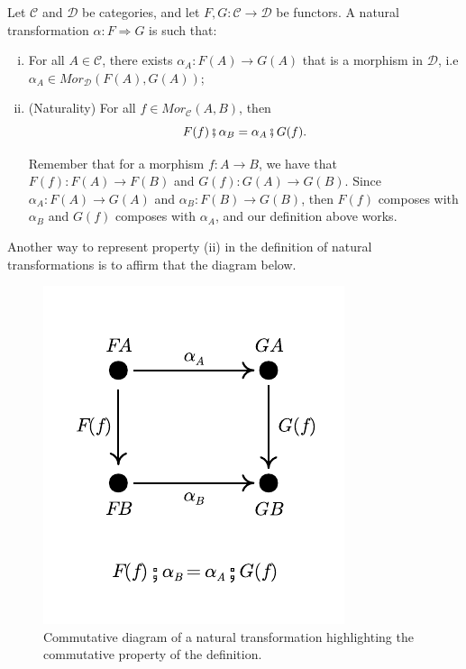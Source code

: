 \begin{definition}
	Let $\mathcal C$ and $\mathcal D$ be categories, and let $F,G:\mathcal C \to \mathcal D$ be functors.
	A natural transformation $\alpha: F \Rightarrow G$ is such that:
	\begin{enumerate}[(i)]
		\item For all $A \in \mathcal C$, there exists $\alpha_A :F(A) \to G(A)$ that is
		      a morphism in $\mathcal D$, i.e $\alpha_A \in Mor_\mathcal D (F(A), G(A))$;
		\item (Naturality) For all $f \in Mor_\mathcal C (A,B)$, then
		      \begin{displaymath}
			      F(f)\fatsemi \alpha_B = \alpha_A \fatsemi G(f).
		      \end{displaymath}

		      Remember that for a morphism $f:A \to B$, we have that $F(f):F(A)\to F(B)$ and $G(f):G(A) \to G(B)$.
		      Since $\alpha_A: F(A) \to G(A)$ and $\alpha_B : F(B) \to G(B)$, then $F(f)$ composes
		      with $\alpha_B$ and $G(f)$ composes with $\alpha_A$, and our definition above works.
	\end{enumerate}
	\label{def:NaturalTransformation}
\end{definition}

Another way to represent property (ii) in the definition of natural transformations
is to affirm that the diagram below.

\begin{figure}[H]
	\begin{center}
		\includegraphics{./notebooks/NaturalTransformation.pdf}
	\end{center}
	\caption{Commutative diagram of a natural transformation highlighting the commutative property of the definition.}
	\label{fig:NaturalTransformation}
\end{figure}

